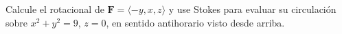 ﻿Calcule el rotacional de $\mathbf F=\langle-y,x,z\rangle$ y use Stokes para evaluar su circulación sobre $x^2+y^2=9$, $z=0$, en sentido antihorario visto desde arriba.
